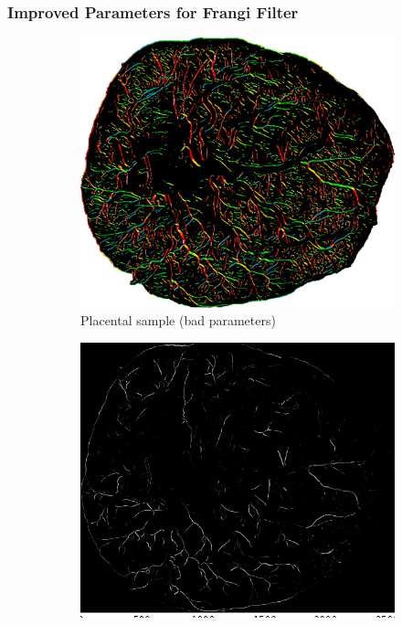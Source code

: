 \documentclass[9pt]{beamer}
\begin{document}
\begin{frame}
	\frametitle{Improved Parameters for Frangi Filter}
	\begin{figure}
		\begin{subfigure}[t]{0.33\textwidth}
			\includegraphics[width=\textwidth]{04-raw.png}
			\caption{Placental sample (bad parameters)}
		\end{subfigure}
		\begin{subfigure}[t]{0.33\textwidth}
			\includegraphics[width=\textwidth]{04-improved.png}

\end{subfigure}
\end{figure}
\end{frame}
\end{document}
